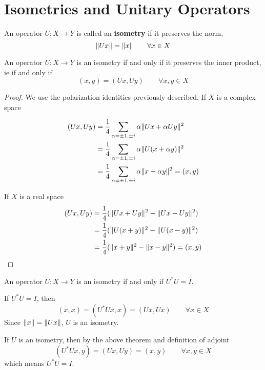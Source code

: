 \section{Isometries and Unitary Operators}
\begin{definition}
An operator $U: X \rightarrow Y$ is called an \textbf{isometry} if it preserves the norm, 
$$\lVert Ux\rVert = \lVert x\rVert \qquad \forall x \in X$$
\end{definition}

\begin{theorem}
An operator $U: X \rightarrow Y$ is an isometry if and only if it preserves the inner product, ie if and only if 
$$(x, y) = (Ux, Uy) \qquad \forall x, y \in X$$
\end{theorem}

\begin{proof}
We use the polarization identities previously described. If $X$ is a complex space

$$
\begin{aligned}
(Ux, Uy) &= \frac{1}{4} \sum_{\alpha = \pm 1, \pm i} \alpha \lVert Ux + \alpha Uy\rVert^{2} \\ 
&= \frac{1}{4} \sum_{\alpha = \pm 1, \pm i} \alpha \lVert U(x + \alpha y)\rVert^{2} \\
&= \frac{1}{4} \sum_{\alpha = \pm 1, \pm i} \alpha \lVert x + \alpha y\rVert^{2} = (x, y)
\end{aligned}
$$

If $X$ is a real space 
$$\begin{aligned} 
(Ux, Uy) &= \frac{1}{4}(\lVert Ux + Uy\rVert^{2} - \lVert Ux - Uy\rVert^{2}) \\
&= \frac{1}{4} (\lVert U(x + y)\rVert^{2} - \lVert U(x - y)\rVert^{2}) \\
&= \frac{1}{4} (\lVert x + y\rVert^{2} - \lVert x - y\rVert^{2}) = (x, y)
\end{aligned}
$$
\end{proof}

\begin{lemma}
An operator $U: X \rightarrow Y$ is an isometry if and only if $U^{*}U = I$. 
\end{lemma}

\begin{lproof}
If $U^{*}U = I$, then 
$$(x, x) = (U^{*}Ux, x) = (Ux, Ux) \qquad \forall x \in X$$
Since $\lVert x\rVert = \lVert Ux\rVert$, $U$ is an isometry. 

If $U$ is an isometry, then by the above theorem and definition of adjoint
$$(U^{*} Ux, y) = (Ux, Uy) = (x, y) \qquad \forall x, y \in X$$
which means $U^{*}U = I$. 
\end{lproof}

